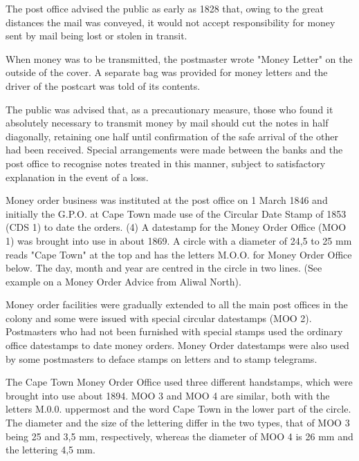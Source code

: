 

The post office advised the public as early as 1828 that, owing to 
the great distances the mail was conveyed, it would not accept 
responsibility for money sent by mail being lost or stolen in transit.

When money was to be transmitted, the postmaster wrote "Money Letter" 
on the outside of the cover. A separate bag was provided for money 
letters and the driver of the postcart was told of its contents.

The public was advised that, as a precautionary measure, those who 
found it absolutely necessary to transmit money by mail should cut 
the notes in half diagonally, retaining one half until confirmation 
of the safe arrival of the other had been received. Special 
arrangements were made between the banks and the post office to 
recognise notes treated in this manner, subject to satisfactory 
explanation in the event of a loss.

Money order business was instituted at the post office on 1 March 1846 
and initially the G.P.O. at Cape Town made use of the Circular 
Date Stamp of 1853 (CDS 1) to date the orders. (4) A datestamp 
for the Money Order Office (MOO 1) was brought into use in about 1869. 
A circle with a diameter of 24,5 to 25 mm reads "Cape Town" at the 
top and has the letters M.O.O. for Money Order Office below. 
The day, month and year are centred in the circle in two lines. 
(See example on a Money Order Advice from Aliwal North).
 

Money order facilities were gradually extended to all the main 
post offices in the colony and some were issued with special 
circular datestamps (MOO 2). Postmasters who had not been 
furnished with special stamps used the ordinary office datestamps 
to date money orders. Money Order datestamps were also used by some
postmasters to deface stamps on letters and to stamp telegrams.




The Cape Town Money Order Office used three different handstamps, 
which were brought into use about 1894. MOO 3 and MOO 4 are 
similar, both with the letters M.0.0. uppermost and the word 
Cape Town in the lower part of the circle. The diameter and the 
size of the lettering differ in the two types, that of MOO 3 
being 25 and 3,5 mm, respectively, whereas the diameter of MOO 4 
is 26 mm and the lettering 4,5 mm.

